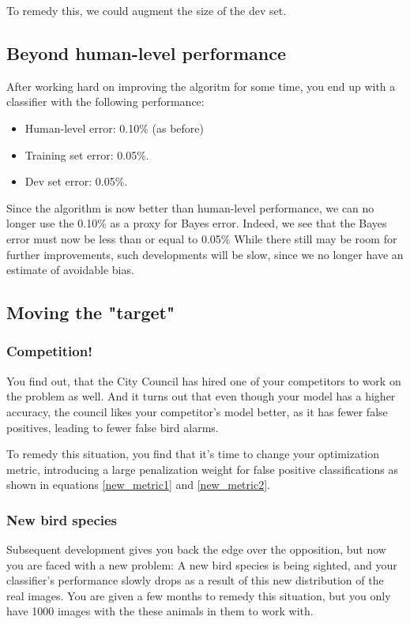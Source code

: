 \documentclass[12pt, a4paper]{article}
\numberwithin{equation}{section}
\begin{document}
To remedy this, we could augment the size of the dev set.

\subsection{Beyond human-level performance}
After working hard on improving the algoritm for some time, you end up with a classifier with the following performance:
\begin{itemize}
\item Human-level error: 0.10\% (as before)
\item Training set error: 0.05\%.
\item Dev set error: 0.05\%.
\end{itemize}
Since the algorithm is now better than human-level performance, we can no longer use the 0.10\% as a proxy for Bayes error. Indeed, we see that the Bayes error must now be less than or equal to 0.05\% While there still may be room for further improvements, such developments will be slow, since we no longer have an estimate of avoidable bias.

\subsection{Moving the "target"}

\subsubsection{Competition!}
You find out, that the City Council has hired one of your competitors to work on the problem as well. And it turns out that even though your model has a higher accuracy, the council likes your competitor's model better, as it has fewer false positives, leading to fewer false bird alarms.

To remedy this situation, you find that it's time to change your optimization metric, introducing a large penalization weight for false positive classifications as shown in equations \ref{new_metric1} and \ref{new_metric2}.

\subsubsection{New bird species}
Subsequent development gives you back the edge over the opposition, but now you are faced with a new problem: A new bird species is being sighted, and your classifier's performance slowly drops as a result of this new distribution of the real images. You are given a few months to remedy this situation, but you only have 1000 images with the these animals in them to work with.
\end{document}
